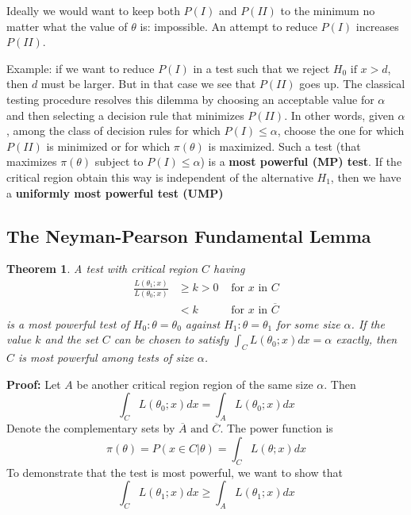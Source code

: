 \documentclass{article}
\newtheorem{theorem}{Theorem}[section]
\begin{document}
Ideally we would want to keep both $P(I)$ and $P(II)$ to the minimum no matter what the value of \(\theta\) is: impossible. An attempt to reduce \(P(I)\) increases \(P(II)\).

Example: if we want to reduce \(P(I)\) in a test such that we reject \(H_0 \text{ if } x > d\), then \(d\) must be larger. But in that case we see that \(P(II)\) goes up. The classical testing procedure resolves this dilemma by choosing an acceptable value for \(\alpha\) and then selecting a decision rule that minimizes \(P(II)\). In other words, given \(\alpha\), among the class of decision rules for which \(P(I) \leq \alpha\), choose the one for which \(P(II)\) is minimized or for which \(\pi(\theta)\) is maximized. Such a test (that maximizes \(\pi(\theta)\) subject to \(P(I) \leq \alpha\)) is a \textbf{most powerful (MP) test}. If the critical region obtain this way is independent of the alternative \(H_1\), then we have a \textbf{uniformly most powerful test (UMP)} 

\subsection{The Neyman-Pearson Fundamental Lemma}

\begin{theorem}
    A test with critical region \(C\) having
    \begin{equation*}
        \begin{array}{ccc}
             \frac{L(\theta_1;x)}{L(\theta_0;x)} & \geq k > 0 & \text{ for } x \text{ in } C  \\
             & < k & \text{ for } x \text{ in } \overline{C}
             \end{array}
    \end{equation*}
    is a most powerful test of \(H_0:\theta=\theta_0\) against \(H_1:\theta=\theta_1\) for some size \(\alpha\). If the value \(k\) and the set \(C\) can be chosen to satisfy \(\int_C L(\theta_0;x) dx = \alpha\) exactly, then \(C\) is most powerful among tests of size \(\alpha\).
\end{theorem}

\textbf{Proof:} Let \(A\) be another critical region region of the same size \(\alpha\). Then
\begin{equation*}
    \int_C L(\theta_0;x)dx=\int_A L(\theta_0;x) dx
\end{equation*}
Denote the complementary sets by \(\overline{A} \text{ and } \overline{C}\). The power function is
\begin{equation*}
    \pi(\theta)=P(x \in C|\theta)= \int_C L(\theta;x) dx
\end{equation*}
To demonstrate that the test is most powerful, we want to show that
\begin{equation*}
    \int_C L(\theta_1;x) dx \geq \int_A L(\theta_1;x) dx
\end{equation*}
\end{document}
